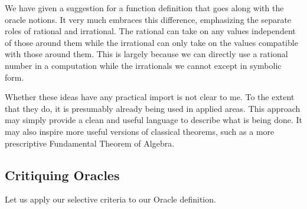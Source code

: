\documentclass[12pt]{article}
\theoremstyle{remark}
\begin{document}
We have given a suggestion for a function definition that goes along with the oracle notions. It very much embraces this difference, emphasizing the separate roles of rational and irrational. The rational can take on any values independent of those around them while the irrational can only take on the values compatible with those around them. This is largely because we can directly use a rational number in a computation while the irrationals we cannot except in symbolic form. 

Whether these ideas have any practical import is not clear to me. To the extent that they do, it is presumably already being used in applied areas. This approach may simply provide a clean and useful language to describe what is being done. It may also inspire more useful versions of classical theorems, such as a more prescriptive Fundamental Theorem of Algebra. 

\subsection{Critiquing Oracles}

Let us apply our selective criteria to our Oracle definition. 
\end{document}
